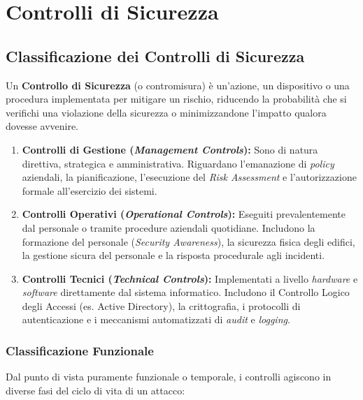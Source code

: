 \chapter{Controlli di Sicurezza}

\section{Classificazione dei Controlli di Sicurezza}
\begin{defbox}
Un \textbf{Controllo di Sicurezza} (o contromisura) è un'azione, un dispositivo o una procedura implementata per mitigare un rischio, riducendo la probabilità che si verifichi una violazione della sicurezza o minimizzandone l'impatto qualora dovesse avvenire.
\end{defbox}
\begin{exbox}
\begin{enumerate}
    \item \textbf{Controlli di Gestione (\textit{Management Controls}):} Sono di natura direttiva, strategica e amministrativa. Riguardano l'emanazione di \textit{policy} aziendali, la pianificazione, l'esecuzione del \textit{Risk Assessment} e l'autorizzazione formale all'esercizio dei sistemi.
    \item \textbf{Controlli Operativi (\textit{Operational Controls}):} Eseguiti prevalentemente dal personale o tramite procedure aziendali quotidiane. Includono la formazione del personale (\textit{Security Awareness}), la sicurezza fisica degli edifici, la gestione sicura del personale e la risposta procedurale agli incidenti.
    \item \textbf{Controlli Tecnici (\textit{Technical Controls}):} Implementati a livello \textit{hardware} e \textit{software} direttamente dal sistema informatico. Includono il Controllo Logico degli Accessi (es. Active Directory), la crittografia, i protocolli di autenticazione e i meccanismi automatizzati di \textit{audit} e \textit{logging}.
\end{enumerate}
\end{exbox}

\subsection{Classificazione Funzionale}
Dal punto di vista puramente funzionale o temporale, i controlli agiscono in diverse fasi del ciclo di vita di un attacco:

